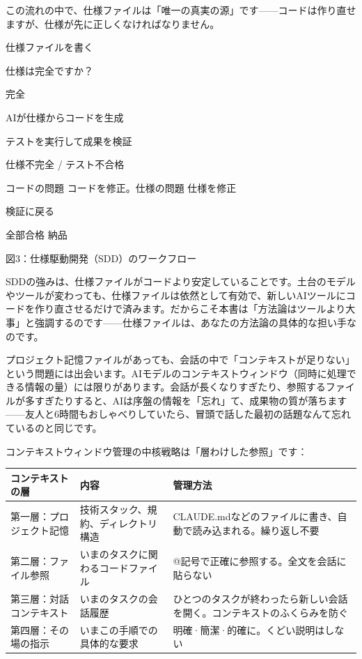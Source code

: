 この流れの中で、仕様ファイルは「唯一の真実の源」です——コードは作り直せますが、仕様が先に正しくなければなりません。

仕様ファイルを書く

仕様は完全ですか？

完全

AIが仕様からコードを生成

テストを実行して成果を検証

仕様不完全 / テスト不合格

コードの問題 コードを修正。仕様の問題 仕様を修正

検証に戻る

全部合格 納品

\begin{center}\small\color{gray}図3：仕様駆動開発（SDD）のワークフロー\end{center}

SDDの強みは、仕様ファイルがコードより安定していることです。土台のモデルやツールが変わっても、仕様ファイルは依然として有効で、新しいAIツールにコードを作り直させるだけで済みます。だからこそ本書は「方法論はツールより大事」と強調するのです——仕様ファイルは、あなたの方法論の具体的な担い手なのです。


プロジェクト記憶ファイルがあっても、会話の中で「コンテキストが足りない」という問題には出会います。AIモデルのコンテキストウィンドウ（同時に処理できる情報の量）には限りがあります。会話が長くなりすぎたり、参照するファイルが多すぎたりすると、AIは序盤の情報を「忘れ」て、成果物の質が落ちます——友人と6時間もおしゃべりしていたら、冒頭で話した最初の話題なんて忘れているのと同じです。

コンテキストウィンドウ管理の中核戦略は「層わけした参照」です：

\begin{center}
\begin{tabularx}{\linewidth}{|X|X|X|}
\hline
\textbf{コンテキストの層} & \textbf{内容} & \textbf{管理方法} \tabularnewline
\hline
第一層：プロジェクト記憶 & 技術スタック、規約、ディレクトリ構造 & CLAUDE.mdなどのファイルに書き、自動で読み込まれる。繰り返し不要 \tabularnewline
第二層：ファイル参照 & いまのタスクに関わるコードファイル & @記号で正確に参照する。全文を会話に貼らない \tabularnewline
第三層：対話コンテキスト & いまのタスクの会話履歴 & ひとつのタスクが終わったら新しい会話を開く。コンテキストのふくらみを防ぐ \tabularnewline
第四層：その場の指示 & いまこの手順での具体的な要求 & 明確·簡潔·的確に。くどい説明はしない \tabularnewline
\hline
\end{tabularx}
\end{center}

